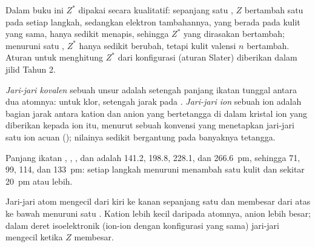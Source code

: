 \begin{remark}\label{rem:b1:periodicity:slater}
Dalam buku ini $Z^{*}$ dipakai secara kualitatif: sepanjang satu
, $Z$ bertambah satu pada setiap langkah, sedangkan elektron
tambahannya, yang berada pada kulit yang sama, hanya sedikit menapis,
sehingga $Z^{*}$ yang dirasakan  bertambah; menuruni satu
, $Z^{*}$ hanya sedikit berubah, tetapi kulit valensi $n$
bertambah. Aturan untuk menghitung $Z^{*}$ dari konfigurasi (aturan
Slater) diberikan dalam jilid Tahun 2.
\end{remark}

\begin{definition}\label{def:b1:periodicity:radius}
\emph{Jari-jari kovalen} sebuah unsur adalah
setengah panjang ikatan tunggal antara dua atomnya: untuk klor, setengah
jarak  pada . \emph{Jari-jari ion}
sebuah ion adalah bagian jarak antara kation dan anion yang bertetangga
di dalam kristal ion yang diberikan kepada ion itu, menurut sebuah
konvensi yang menetapkan jari-jari satu ion acuan (); nilainya
sedikit bergantung pada banyaknya tetangga.
\end{definition}

\begin{example}[Halogen]\label{ex:b1:periodicity:halogen-radii}
Panjang ikatan , , , dan  adalah 141.2,
198.8, 228.1, dan \qty{266.6}{pm}, sehingga  71, 99,
114, dan \qty{133}{pm}: setiap langkah menuruni  menambah satu
kulit dan sekitar \qty{20}{pm} atau lebih.
\end{example}

\begin{proposition}\label{prop:b1:periodicity:radius-trend}
Jari-jari atom mengecil dari kiri ke kanan sepanjang satu  dan
membesar dari atas ke bawah menuruni satu . Kation lebih kecil
daripada atomnya, anion lebih besar; dalam deret isoelektronik (ion-ion
dengan konfigurasi yang sama) jari-jari mengecil ketika $Z$ membesar.
\end{proposition}

